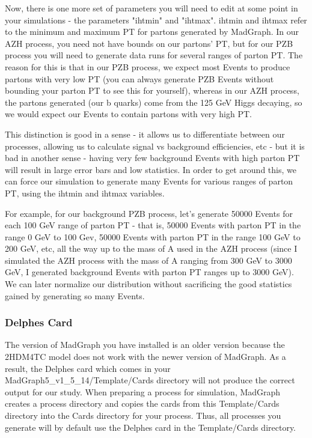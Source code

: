 \documentclass{article}
\begin{document}
Now, there is one more set of parameters you will need to edit at some point in your simulations - the parameters "ihtmin" and "ihtmax".
ihtmin and ihtmax refer to the minimum and maximum PT for partons generated by MadGraph. In our AZH process, you need not have bounds
on our partons' PT, but for our PZB process you will need to generate data runs for several ranges of parton PT. The reason for this is
that in our PZB process, we expect most Events to produce partons with very low PT (you can always generate PZB Events without bounding
your parton PT to see this for yourself), whereas in our AZH process, the partons generated (our b quarks) come from the 125 GeV Higgs decaying,
so we would expect our Events to contain partons with very high PT.

\bigskip

This distinction is good in a sense - it allows us to differentiate between
our processes, allowing us to calculate signal vs background efficiencies, etc - but it is bad in another sense - having very few background Events
with high parton PT will result in large error bars and low statistics. In order to get around this, we can force our simulation to generate
many Events for various ranges of parton PT, using the ihtmin and ihtmax variables.

\bigskip

For example, for our background PZB process, let's generate
50000 Events for each 100 GeV range of parton PT - that is, 50000 Events with parton PT in the range 0 GeV to 100 Gev, 50000 Events with parton
PT in the range 100 GeV to 200 GeV, etc, all the way up to the mass of A used in the AZH process (since I simulated the AZH process with the mass
of A ranging from 300 GeV to 3000 GeV, I generated background Events with parton PT ranges up to 3000 GeV). We can later normalize our distribution without
sacrificing the good statistics gained by generating so many Events.

\subsubsection{Delphes Card}
\label{sec:delphesCard}

The version of MadGraph you have installed is an older version because the 2HDM4TC model does
not work with the newer version of MadGraph. As a result, the Delphes card which comes in your MadGraph5\_v1\_5\_14/Template/Cards
directory will not produce the correct output for our study. When preparing a process for
simulation, MadGraph creates a process directory and copies the cards from this Template/Cards
directory into the Cards directory for your process. Thus, all processes you generate will by
default use the Delphes card in the Template/Cards directory.
\end{document}
